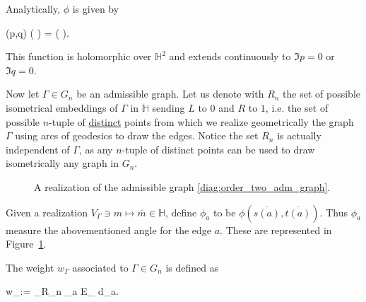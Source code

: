 Analytically, $\phi$ is given by
\begin{eqalign}
	(p,q) \longmapsto \arg\left(  \right) =  \log \left(  \cdot {} \right).
\end{eqalign}
This function is holomorphic over $\mathbb H^2$ and extends continuously to $\Im{p} = 0$ or $\Im{q} = 0$.

Now let $\Gamma \in G_n$ be an admissible graph. Let us denote with $R_n$ the set of possible isometrical embeddings of $\Gamma$ in $\mathbb H$ sending $L$ to $0$ and $R$ to $1$, i.e. the set of possible $n$-tuple of \underline{distinct} points from which we realize geometrically the graph $\Gamma$ using arcs of geodesics to draw the edges. Notice the set $R_n$ is actually independent of $\Gamma$, as any $n$-tuple of distinct points can be used to draw isometrically any graph in $G_n$.

\begin{figure}[H]
	\centering
	\caption{A realization of the admissible graph \eqref{diag:order_two_adm_graph}.}
	\label{fig:realization_ex}
\end{figure}

Given a realization $V_\Gamma \ni m \mapsto \overline{m} \in \mathbb H$, define $\phi_a$ to be $\phi(\overline{s(a)}, \overline{t(a)})$. Thus $\phi_a$ measure the abovementioned angle for the edge $a$. These are represented in Figure~\ref{fig:realization_ex}.

\begin{definition}
	The weight $w_\Gamma$ associated to $\Gamma \in G_n$ is defined as
	\begin{eqalign}
		w_\Gamma :=  \int_{R_n} \bigwedge_{a \in E_\Gamma} d\phi_a.
	\end{eqalign}
\end{definition}


